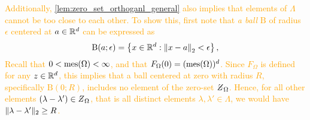 \documentclass[../thesis.tex]{subfiles}
\begin{document}
\textcolor{orange}{  %
\begin{remark}
    Additionally, \cref{lem:zero_set_orthoganl_general} also implies that elements of $\Lambda$ cannot be too close to each other. To show this, first note that \emph{a ball} $\mathrm{B}$ of radius $\epsilon$ centered at $a\in\mathbb{R}^d$ can be expressed as 
    \begin{equation*}
        \mathrm{B}(a ; \epsilon) = \left\{x\in \mathbb{R}^d : \left \|x-a\right \|_2 < \epsilon\right\},
    \end{equation*}
    Recall that $0<\operatorname{mes}(\Omega)<\infty$, and that $F_{\Omega}(0)=(\operatorname{mes}(\Omega))^d $. Since $F_{\Omega}$ is defined for any $z \in \mathbb{R}^d$, this implies that a ball centered at zero with radius $R$, specifically $\mathrm{B}(0; R)$, includes no element of the zero-set $\Zstroke_{\Omega}$. Hence, for all other elements $(\lambda-\lambda')\in \Zstroke_{\Omega}$, that is all distinct elements $\lambda,\lambda'\in \Lambda$, we would have $\|\lambda-\lambda'\|_2\geq R$.
\end{remark}
} %
\end{document}
